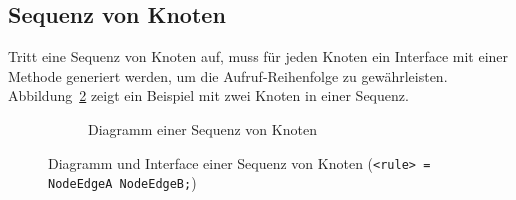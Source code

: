 \documentclass[../InterneDSLs.tex]{subfiles}
\begin{document}
\subsection{Sequenz von Knoten}
Tritt eine Sequenz von Knoten auf, muss für jeden Knoten ein Interface mit einer Methode generiert werden, um die Aufruf-Reihenfolge zu gewährleisten. Abbildung~\ref{FIG:SequenceNode} zeigt ein Beispiel mit zwei Knoten in einer Sequenz.
\begin{figure}[ht]
\centering
  \begin{subfigure}[c]{0.49\textwidth}
    \caption{Diagramm einer Sequenz von Knoten}
    \label{FIG:DiagramSequenceNode}
  \end{subfigure}
  \begin{subfigure}[c]{0.49\textwidth}
    
  \end{subfigure}
  \caption{Diagramm und Interface einer Sequenz von Knoten (\texttt{<rule> = NodeEdgeA NodeEdgeB;})}
  \label{FIG:SequenceNode}
\end{figure}
\end{document}
